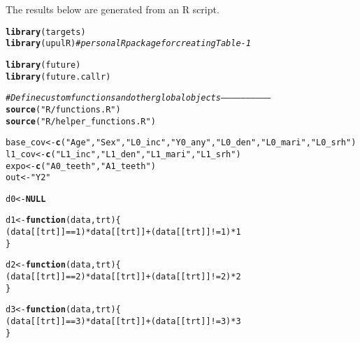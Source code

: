 \documentclass{article}\usepackage[]{graphicx}\usepackage[]{color}
\makeatletter
\newcommand{\hlnum}[1]{\textcolor[rgb]{0.686,0.059,0.569}{#1}}%
\newcommand{\hlstr}[1]{\textcolor[rgb]{0.192,0.494,0.8}{#1}}%
\newcommand{\hlcom}[1]{\textcolor[rgb]{0.678,0.584,0.686}{\textit{#1}}}%
\newcommand{\hlopt}[1]{\textcolor[rgb]{0,0,0}{#1}}%
\newcommand{\hlstd}[1]{\textcolor[rgb]{0.345,0.345,0.345}{#1}}%
\newcommand{\hlkwa}[1]{\textcolor[rgb]{0.161,0.373,0.58}{\textbf{#1}}}%
\newcommand{\hlkwb}[1]{\textcolor[rgb]{0.69,0.353,0.396}{#1}}%
\newcommand{\hlkwc}[1]{\textcolor[rgb]{0.333,0.667,0.333}{#1}}%
\newcommand{\hlkwd}[1]{\textcolor[rgb]{0.737,0.353,0.396}{\textbf{#1}}}%
\newenvironment{kframe}{%
 \def\at@end@of@kframe{}%
 \ifinner\ifhmode%
  \def\at@end@of@kframe{\end{minipage}}%
  \begin{minipage}{\columnwidth}%
 \fi\fi%
 \def\FrameCommand##1{\hskip\@totalleftmargin \hskip-\fboxsep
 \colorbox{shadecolor}{##1}\hskip-\fboxsep
     \hskip-\linewidth \hskip-\@totalleftmargin \hskip\columnwidth}%
 \MakeFramed {\advance\hsize-\width
   \@totalleftmargin\z@ \linewidth\hsize
   \@setminipage}}%
 {\par\unskip\endMakeFramed%
 \at@end@of@kframe}
\newenvironment{knitrout}{}{} %
\makeatother
\begin{document}
\title{}



\maketitle
The results below are generated from an R script.

\begin{knitrout}
\color{fgcolor}\begin{kframe}
\begin{alltt}
\hlkwd{library}\hlstd{(targets)}
\hlkwd{library}\hlstd{(upulR)} \hlcom{# personal R package for creating Table-1}

\hlkwd{library}\hlstd{(future)}
\hlkwd{library}\hlstd{(future.callr)}



\hlcom{# Define custom functions and other global objects -----------------------------}
\hlkwd{source}\hlstd{(}\hlstr{"R/functions.R"}\hlstd{)}
\hlkwd{source}\hlstd{(}\hlstr{"R/helper_functions.R"}\hlstd{)}



\hlstd{base_cov} \hlkwb{<-} \hlkwd{c}\hlstd{(}\hlstr{"Age"}\hlstd{,}\hlstr{"Sex"}\hlstd{,}\hlstr{"L0_inc"}\hlstd{,} \hlstr{"Y0_any"}\hlstd{,}\hlstr{"L0_den"}\hlstd{,} \hlstr{"L0_mari"}\hlstd{,}\hlstr{"L0_srh"}\hlstd{)}
\hlstd{l1_cov} \hlkwb{<-} \hlkwd{c}\hlstd{(}\hlstr{"L1_inc"}\hlstd{,} \hlstr{"L1_den"}\hlstd{,} \hlstr{"L1_mari"}\hlstd{,} \hlstr{"L1_srh"}\hlstd{)}
\hlstd{expo} \hlkwb{<-} \hlkwd{c}\hlstd{(}\hlstr{"A0_teeth"}\hlstd{,}\hlstr{"A1_teeth"}\hlstd{)}
\hlstd{out} \hlkwb{<-} \hlstr{"Y2"}


\hlstd{d0} \hlkwb{<-}  \hlkwa{NULL}

\hlstd{d1} \hlkwb{<-}  \hlkwa{function}\hlstd{(}\hlkwc{data}\hlstd{,} \hlkwc{trt}\hlstd{) \{}
  \hlstd{(data[[trt]]}\hlopt{==}\hlnum{1}\hlstd{)}\hlopt{*}\hlstd{data[[trt]]}\hlopt{+} \hlstd{(data[[trt]]}\hlopt{!=}\hlnum{1}\hlstd{)}\hlopt{*} \hlnum{1}
\hlstd{\}}

\hlstd{d2} \hlkwb{<-}  \hlkwa{function}\hlstd{(}\hlkwc{data}\hlstd{,} \hlkwc{trt}\hlstd{) \{}
  \hlstd{(data[[trt]]}\hlopt{==}\hlnum{2}\hlstd{)}\hlopt{*}\hlstd{data[[trt]]}\hlopt{+} \hlstd{(data[[trt]]}\hlopt{!=}\hlnum{2}\hlstd{)}\hlopt{*} \hlnum{2}
\hlstd{\}}

\hlstd{d3} \hlkwb{<-}  \hlkwa{function}\hlstd{(}\hlkwc{data}\hlstd{,} \hlkwc{trt}\hlstd{) \{}
  \hlstd{(data[[trt]]}\hlopt{==}\hlnum{3}\hlstd{)}\hlopt{*}\hlstd{data[[trt]]}\hlopt{+} \hlstd{(data[[trt]]}\hlopt{!=}\hlnum{3}\hlstd{)}\hlopt{*} \hlnum{3}
\hlstd{\}}


\end{alltt}
\end{kframe}
\end{knitrout}
\end{document}
